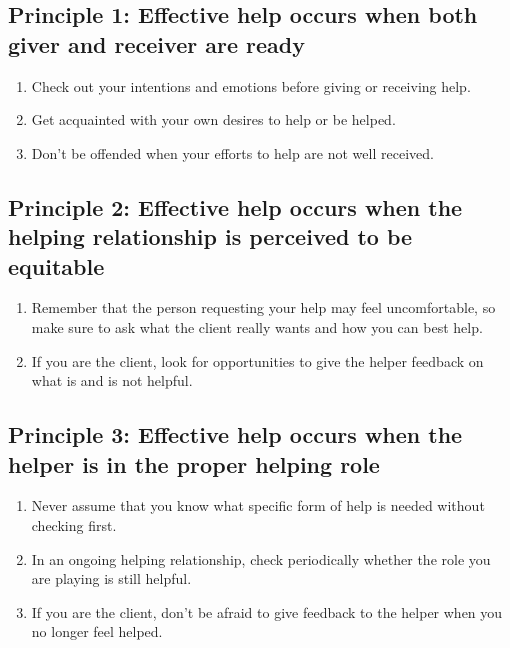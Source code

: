 \documentclass{article}
\newenvironment{nosepenumerate}
{ \begin{enumerate}
    \setlength{\itemsep}{0pt}
    \setlength{\parskip}{0pt}
    \setlength{\parsep}{0pt}     }
{ \end{enumerate}                  }
\begin{document}
\begin{multicols}{2}

\subsection{Principle 1: Effective help occurs when both giver and receiver are ready}
\begin{nosepenumerate}
    \item Check out your intentions and emotions before giving or receiving help.
    \item Get acquainted with your own desires to help or be helped.
    \item Don't be offended when your efforts to help are not well received.
\end{nosepenumerate}

\subsection{Principle 2: Effective help occurs when the helping relationship is perceived to be equitable}
\begin{nosepenumerate}
    \item Remember that the person requesting your help may feel uncomfortable, so make sure to ask what the client really wants and how you can best help.
    \item If you are the client, look for opportunities to give the helper feedback on what is and is not helpful.
\end{nosepenumerate}

\subsection{Principle 3: Effective help occurs when the helper is in the proper helping role}
\begin{nosepenumerate}
    \item Never assume that you know what specific form of help is needed without checking first.
    \item In an ongoing helping relationship, check periodically whether the role you are playing is still helpful.
    \item If you are the client, don't be afraid to give feedback to the helper when you no longer feel helped.
\end{nosepenumerate}


\end{multicols}
\end{document}
